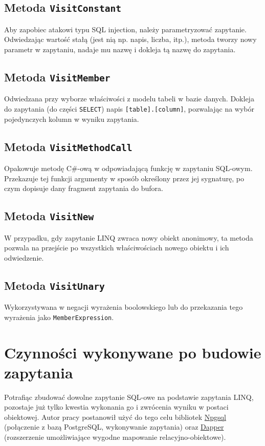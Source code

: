 \subsection{Metoda \texttt{VisitConstant}}
Aby zapobiec atakowi typu SQL injection, należy parametryzować zapytanie. Odwiedzając wartość stałą (jest nią np. napis, liczba, itp.), metoda tworzy nowy parametr w zapytaniu, nadaje mu nazwę i dokleja tą nazwę do zapytania.

\subsection{Metoda \texttt{VisitMember}}
Odwiedzana przy wyborze właściwości z modelu tabeli w bazie danych. Dokleja do zapytania (do części \texttt{SELECT}) napis \texttt{[table].[column]}, pozwalając na wybór pojedynczych kolumn w wyniku zapytania.

\subsection{Metoda \texttt{VisitMethodCall}}
Opakowuje metodę C\#-ową w odpowiadającą funkcję w zapytaniu SQL-owym. Przekazuje tej funkcji argumenty w sposób określony przez jej sygnaturę, po czym dopisuje dany fragment zapytania do bufora.

\subsection{Metoda \texttt{VisitNew}}
W przypadku, gdy zapytanie LINQ zwraca nowy obiekt anonimowy, ta metoda pozwala na przejście po wszystkich właściwościach nowego obiektu i ich odwiedzenie.

\subsection{Metoda \texttt{VisitUnary}}
Wykorzystywana w negacji wyrażenia boolowskiego lub do przekazania tego wyrażenia jako \texttt{MemberExpression}.

\section{Czynności wykonywane po budowie zapytania}
Potrafiąc zbudować dowolne zapytanie SQL-owe na podstawie zapytania LINQ, pozostaje już tylko kwestia wykonania go i zwrócenia wyniku w postaci obiektowej. Autor pracy postanowił użyć do tego celu bibliotek \href{}{Npgsql} (połączenie z bazą PostgreSQL, wykonywanie zapytania) oraz \href{}{Dapper} (rozszerzenie umożliwiające wygodne mapowanie relacyjno-obiektowe).

